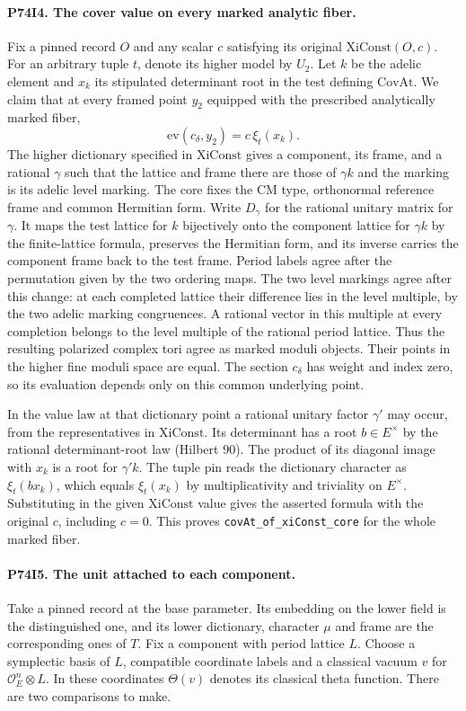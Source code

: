 \paragraph{P74I4. The cover value on every marked analytic fiber.}
Fix a pinned record $O$ and any scalar $c$ satisfying its original
$\mathrm{XiConst}(O,c)$. For an arbitrary tuple $t$, denote its
higher model by $U_2$. Let $k$ be the adelic element and $x_k$ its
stipulated determinant root in the test defining $\mathrm{CovAt}$.
We claim that at every framed point $y_2$ equipped with the prescribed
analytically marked fiber,
\[
              \mathrm{ev}(c_\delta,y_2)=c\,\xi_t(x_k).
\]
The higher dictionary specified in $\mathrm{XiConst}$ gives a
component, its frame, and a rational $\gamma$ such that the lattice
and frame there are those of $\gamma k$ and the marking is its
adelic level marking. The core fixes the CM type, orthonormal
reference frame and common Hermitian form. Write $D_\gamma$ for the
rational unitary matrix for $\gamma$. It maps the test lattice for
$k$ bijectively onto the component lattice for $\gamma k$ by the
finite-lattice formula, preserves the Hermitian form, and its
inverse carries the component frame back to the test frame. Period
labels agree after the permutation given by the two ordering maps.
The two level markings agree after this change: at each completed
lattice their difference lies in the level multiple, by the two
adelic marking congruences. A rational vector in this multiple at
every completion belongs to the level multiple of the rational
period lattice. Thus the resulting polarized complex tori agree as
marked moduli objects. Their points in the higher fine moduli space
are equal. The section $c_\delta$ has weight and index zero, so
its evaluation depends only on this common underlying point.

In the value law at that dictionary point a rational unitary factor
$\gamma'$ may occur, from the representatives in $\mathrm{XiConst}$.
Its determinant has a root $b\in E^\times$ by the rational
determinant-root law (Hilbert 90). The product of its diagonal
image with $x_k$ is a root for $\gamma'k$. The tuple pin reads the
dictionary character as $\xi_t(bx_k)$, which equals $\xi_t(x_k)$
by multiplicativity and triviality on $E^\times$. Substituting
in the given $\mathrm{XiConst}$ value gives the asserted formula
with the original $c$, including $c=0$. This proves
\texttt{covAt\_of\_xiConst\_core} for the whole marked fiber.

\paragraph{P74I5. The unit attached to each component.}
Take a pinned record at the base parameter. Its embedding on the
lower field is the distinguished one, and its lower dictionary,
character $\mu$ and frame are the corresponding ones of $T$. Fix a
component with period lattice $L$. Choose a symplectic basis of $L$,
compatible coordinate labels and a classical vacuum $v$ for
$\mathcal O_E^n\otimes L$. In these coordinates $\Theta(v)$ denotes
its classical theta function. There are two comparisons to make.


